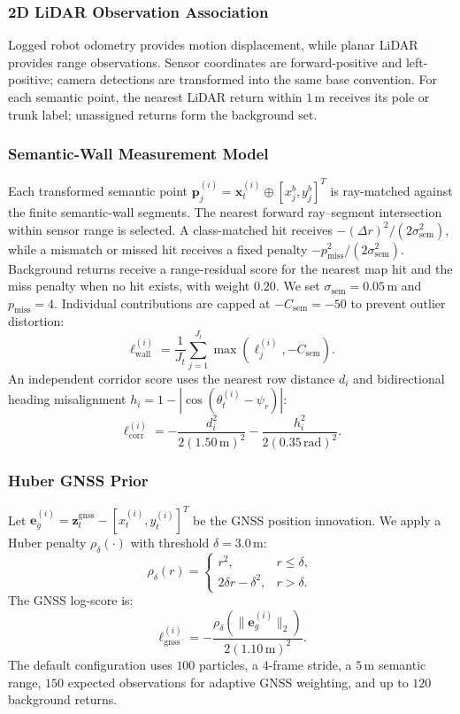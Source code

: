 \documentclass[letterpaper, 10 pt, conference]{ieeeconf}
\begin{document}
\subsubsection{2D LiDAR Observation Association}
Logged robot odometry provides motion displacement, while planar LiDAR provides range observations. Sensor coordinates are forward-positive and left-positive; camera detections are transformed into the same base convention. For each semantic point, the nearest LiDAR return within $1\,$m receives its pole or trunk label; unassigned returns form the background set.

\subsubsection{Semantic-Wall Measurement Model}
Each transformed semantic point $\mathbf{p}_j^{(i)} = \mathbf{x}_t^{(i)} \oplus [x_j^b, y_j^b]^T$ is ray-matched against the finite semantic-wall segments. The nearest forward ray--segment intersection within sensor range is selected. A class-matched hit receives $-(\Delta r)^2/(2\sigma_{\text{sem}}^2)$, while a mismatch or missed hit receives a fixed penalty $-p_{\text{miss}}^2/(2\sigma_{\text{sem}}^2)$. Background returns receive a range-residual score for the nearest map hit and the miss penalty when no hit exists, with weight $0.20$. We set $\sigma_{\text{sem}}=0.05\,$m and $p_{\text{miss}}=4$. Individual contributions are capped at $-C_{\text{sem}}=-50$ to prevent outlier distortion:
\begin{equation}
\ell_{\text{wall}}^{(i)} = \frac{1}{J_t}\sum_{j=1}^{J_t}\max\left(\ell_{j}^{(i)},-C_{\text{sem}}\right).
\end{equation}
An independent corridor score uses the nearest row distance $d_i$ and bidirectional heading misalignment $h_i=1-|\cos(\theta_t^{(i)}-\psi_r)|$:
\begin{equation}
\ell_{\text{corr}}^{(i)} = -\frac{d_i^2}{2(1.50\,\mathrm{m})^2} - \frac{h_i^2}{2(0.35\,\mathrm{rad})^2}.
\end{equation}

\subsubsection{Huber GNSS Prior}
Let $\mathbf{e}_g^{(i)} = \mathbf{z}_t^{\text{gnss}} - [x_t^{(i)}, y_t^{(i)}]^T$ be the GNSS position innovation. We apply a Huber penalty $\rho_\delta(\cdot)$ with threshold $\delta = 3.0\,$m:
\begin{equation}
\rho_\delta(r) = \begin{cases}
r^2, & r \le \delta, \\
2\delta r-\delta^2, & r > \delta.
\end{cases}
\end{equation}
The GNSS log-score is:
\begin{equation}
\ell_{\text{gnss}}^{(i)} = -\frac{\rho_\delta(\|\mathbf{e}_g^{(i)}\|_2)}{2(1.10\,\mathrm{m})^2}.
\end{equation}
The default configuration uses $100$ particles, a $4$-frame stride, a $5\,$m semantic range, $150$ expected observations for adaptive GNSS weighting, and up to $120$ background returns.
\end{document}
